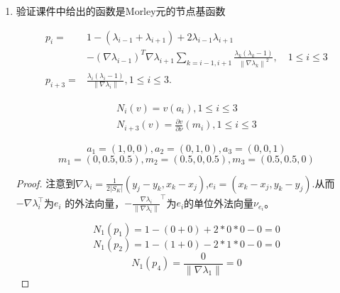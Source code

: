 \documentclass[12pt,a4paper]{article}
\begin{document}
\begin{enumerate}
		\begin{proof}
			不妨设某条内边$e = (-1,0)\rightarrow(1,0)$,相邻单元为$K_1,K_2$.
			
			考虑$v |_ {K_1} = x^2-1,v |_ {K_2} = 1-x^2$.满足$v \in V_h$但$v \notin H^1(\Omega)$
		\end{proof}
		\item 验证课件中给出的函数是Morley元的节点基函数
		
		\begin{equation*}
			\begin{aligned}
				p_{i}=& 1-(\lambda_{i-1}+\lambda_{i+1})+2\lambda_{i-1}\lambda_{i+1}  \\
				&-\left(\nabla\lambda_{i-1}\right)^T\nabla\lambda_{i+1}\sum_{k=i-1,i+1}\frac{\lambda_k(\lambda_k-1)}{\left\|\nabla\lambda_k\right\|^2},\quad1\leq i\leq3 \\
				p_{i+3}=& \frac{\lambda_{i}(\lambda_{i}-1)}{\|\nabla\lambda_{i}\|},1\leq i\leq3. 
			\end{aligned}
		\end{equation*}
		
		\begin{equation*}
			\begin{aligned}
				N_i(v)=v(a_i),1\leq i\leq3\\N_{i+3}(v)=\frac{\partial v}{\partial\nu}(m_i),1\leq i\leq3
			\end{aligned}
		\end{equation*}
		
		$$a_1 = (1,0,0),a_2=(0,1,0),a_3=(0,0,1)$$
		$$m_1 = (0,0.5,0.5),m_2=(0.5,0,0.5),m_3=(0.5,0.5,0)$$
		
		\begin{proof}
			
			
			注意到$\nabla \lambda_i = \frac{1}{2|S_K|} (y_j-y_k,x_k-x_j)$,$e_i=(x_k-x_j,y_k-y_j)$.从而$-\nabla \lambda_i ^\top$为$e_i$ 的外法向量，$-\frac{\nabla \lambda_i}{\|\nabla \lambda_i\|}^\top$为$e_i$的单位外法向量$\nu_{e_i}$。
			
			$$N_1(p_1) = 1-(0+0)+2*0*0-0 = 0$$
			$$N_1(p_2) = 1- (1+0) - 2*1*0 - 0 = 0$$
			$$N_1(p_4) = \frac{0}{\|\nabla \lambda_1\|} = 0$$
			

\end{proof}
\end{enumerate}
\end{document}

